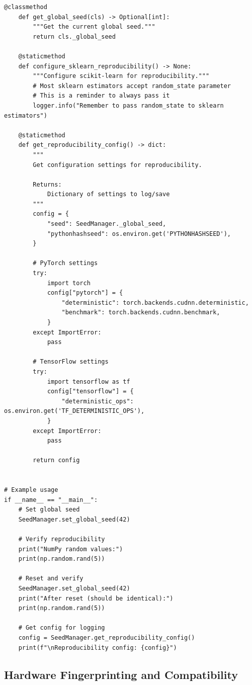 \begin{lstlisting}[style=python, caption={Comprehensive random seed management}]
    @classmethod
    def get_global_seed(cls) -> Optional[int]:
        """Get the current global seed."""
        return cls._global_seed

    @staticmethod
    def configure_sklearn_reproducibility() -> None:
        """Configure scikit-learn for reproducibility."""
        # Most sklearn estimators accept random_state parameter
        # This is a reminder to always pass it
        logger.info("Remember to pass random_state to sklearn estimators")

    @staticmethod
    def get_reproducibility_config() -> dict:
        """
        Get configuration settings for reproducibility.

        Returns:
            Dictionary of settings to log/save
        """
        config = {
            "seed": SeedManager._global_seed,
            "pythonhashseed": os.environ.get('PYTHONHASHSEED'),
        }

        # PyTorch settings
        try:
            import torch
            config["pytorch"] = {
                "deterministic": torch.backends.cudnn.deterministic,
                "benchmark": torch.backends.cudnn.benchmark,
            }
        except ImportError:
            pass

        # TensorFlow settings
        try:
            import tensorflow as tf
            config["tensorflow"] = {
                "deterministic_ops": os.environ.get('TF_DETERMINISTIC_OPS'),
            }
        except ImportError:
            pass

        return config


# Example usage
if __name__ == "__main__":
    # Set global seed
    SeedManager.set_global_seed(42)

    # Verify reproducibility
    print("NumPy random values:")
    print(np.random.rand(5))

    # Reset and verify
    SeedManager.set_global_seed(42)
    print("After reset (should be identical):")
    print(np.random.rand(5))

    # Get config for logging
    config = SeedManager.get_reproducibility_config()
    print(f"\nReproducibility config: {config}")
\end{lstlisting}

\subsection{Hardware Fingerprinting and Compatibility}

